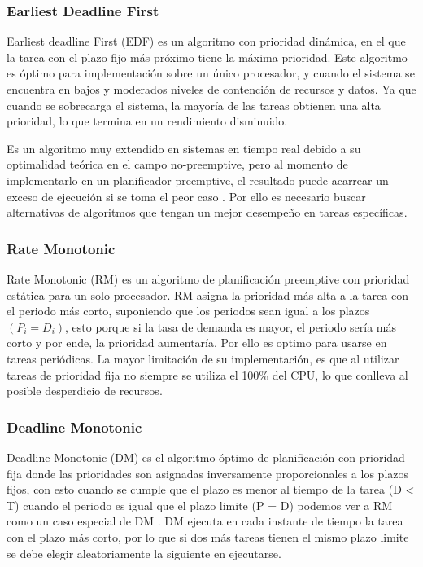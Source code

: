     \subsubsection{Earliest Deadline First} 
    Earliest \gls{deadline} First (EDF) es un algoritmo con prioridad dinámica, en el que la tarea con el plazo fijo más próximo tiene la máxima prioridad. Este algoritmo es óptimo para implementación sobre un único procesador, y cuando el sistema se encuentra en bajos y moderados niveles de contención de recursos y datos\cite{Liu}. Ya que cuando se sobrecarga el sistema, la mayoría de las tareas obtienen una alta prioridad, lo que termina en un rendimiento disminuido.
    
     \vspace{0.3cm}
     
    Es un algoritmo muy extendido en sistemas en tiempo real debido a su optimalidad teórica en el campo no-preemptive, pero al momento de implementarlo en un planificador \gls{preemptive}, el resultado puede acarrear un exceso de ejecución si se toma el peor caso \cite{EmbSysDes}. Por ello es necesario buscar alternativas de algoritmos que tengan un mejor desempeño en tareas específicas.
    
     \subsubsection{Rate Monotonic}
    Rate Monotonic (RM) es un algoritmo de planificación preemptive con prioridad estática para un solo procesador\cite{Liu}. RM asigna la prioridad más alta a la tarea con el periodo más corto, suponiendo que los periodos sean igual a los plazos \( (P_{i} = D_{i}) \), esto porque si la tasa de demanda es mayor, el periodo sería más corto y por ende, la prioridad aumentaría. Por ello es optimo para usarse en tareas periódicas. La mayor limitación de su implementación, es que al utilizar tareas de prioridad fija no siempre se utiliza el 100\%  del \acrshort{CPU}, lo que conlleva al posible desperdicio de recursos\cite{RM}.

\subsubsection{Deadline Monotonic}
Deadline Monotonic (DM) es el algoritmo óptimo de planificación con prioridad fija donde las prioridades son asignadas inversamente proporcionales a los plazos fijos, con esto cuando se cumple que el plazo es menor al tiempo de la tarea (D < T) cuando el periodo es igual que el plazo limite (P = D) podemos ver a RM como un caso especial de DM \cite{NPr}. DM ejecuta en cada instante de tiempo la tarea con el plazo más corto, por lo que si dos más tareas tienen el mismo plazo limite se debe elegir aleatoriamente la siguiente en ejecutarse.

